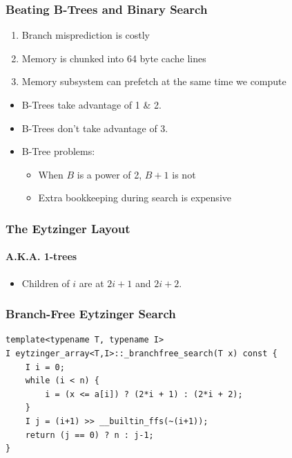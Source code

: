 \documentclass[xcolor=dvipsnames]{beamer}
\begin{document}
\begin{frame}
   \frametitle{Beating B-Trees and Binary Search}

   \begin{enumerate}[<+->]
      \item Branch misprediction is costly
      \item Memory is chunked into 64 byte cache lines
      \item Memory subsystem can prefetch at the same time we compute
   \end{enumerate}
   \begin{itemize}[<+->]
      \item B-Trees take advantage of 1 \& 2.
      \item B-Trees don't take advantage of 3.
      \item B-Tree problems:
      \begin{itemize}
          \item When $B$ is a power of 2, $B+1$ is not
          \item Extra bookkeeping during search is expensive
      \end{itemize}
   \end{itemize}
\end{frame}

\begin{frame}
   \frametitle{The Eytzinger Layout}
   \framesubtitle{A.K.A. 1-trees}
  
   \begin{center}
   \end{center} 
   \begin{itemize}
     \item Children of $i$ are at $2i+1$ and $2i+2$.
   \end{itemize}
\end{frame}

\begin{frame}[fragile]
   \frametitle{Branch-Free Eytzinger Search}

{\small 
\begin{verbatim}
template<typename T, typename I>
I eytzinger_array<T,I>::_branchfree_search(T x) const {
    I i = 0;
    while (i < n) {
        i = (x <= a[i]) ? (2*i + 1) : (2*i + 2);
    }
    I j = (i+1) >> __builtin_ffs(~(i+1));
    return (j == 0) ? n : j-1;
}
\end{verbatim} 
}
\end{frame}
\end{document}
